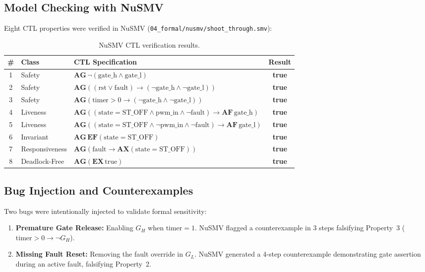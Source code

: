 \documentclass[11pt,a4paper]{article}
\begin{document}
\subsection{Model Checking with NuSMV}
Eight CTL properties were verified in NuSMV (\texttt{04\_formal/nusmv/shoot\_through.smv}):

\begin{table}[H]\centering\small
\caption{NuSMV CTL verification results.}\label{tab:ctl}
\begin{tabularx}{\linewidth}{@{}clXc@{}}
\toprule
\# & Class & CTL Specification & Result\\
\midrule
1 & Safety & $\mathbf{AG}\,\neg(\text{gate\_h} \wedge \text{gate\_l})$ & \textbf{true}\\
2 & Safety & $\mathbf{AG}((\text{rst} \vee \text{fault}) \to (\neg\text{gate\_h} \wedge \neg\text{gate\_l}))$ & \textbf{true}\\
3 & Safety & $\mathbf{AG}(\text{timer} > 0 \to (\neg\text{gate\_h} \wedge \neg\text{gate\_l}))$ & \textbf{true}\\
4 & Liveness & $\mathbf{AG}((\text{state} = \text{ST\_OFF} \wedge \text{pwm\_in} \wedge \neg\text{fault}) \to \mathbf{AF}\,\text{gate\_h})$ & \textbf{true}\\
5 & Liveness & $\mathbf{AG}((\text{state} = \text{ST\_OFF} \wedge \neg\text{pwm\_in} \wedge \neg\text{fault}) \to \mathbf{AF}\,\text{gate\_l})$ & \textbf{true}\\
6 & Invariant & $\mathbf{AG}\,\mathbf{EF}(\text{state} = \text{ST\_OFF})$ & \textbf{true}\\
7 & Responsiveness & $\mathbf{AG}(\text{fault} \to \mathbf{AX}(\text{state} = \text{ST\_OFF}))$ & \textbf{true}\\
8 & Deadlock-Free & $\mathbf{AG}(\mathbf{EX}\,\text{true})$ & \textbf{true}\\
\bottomrule
\end{tabularx}
\end{table}

\subsection{Bug Injection and Counterexamples}
Two bugs were intentionally injected to validate formal sensitivity:
\begin{enumerate}
  \item \textbf{Premature Gate Release:} Enabling $G_H$ when $\text{timer} = 1$. NuSMV flagged a counterexample in 3 steps falsifying Property~3 ($\text{timer} > 0 \to \neg G_H$).
  \item \textbf{Missing Fault Reset:} Removing the fault override in $G_L$. NuSMV generated a 4-step counterexample demonstrating gate assertion during an active fault, falsifying Property~2.
\end{enumerate}
\end{document}
